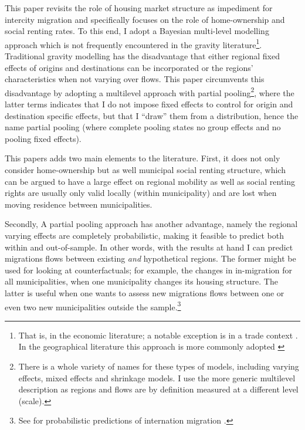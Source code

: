 \documentclass[fleqn,10pt]{SelfArx} %
\begin{document}
        This paper revisits the role of housing market structure as impediment for intercity migration and specifically focuses on the role of home-ownership and social renting rates. To this end, I adopt a Bayesian multi-level
        modelling approach which is not frequently encountered in the
        gravity literature\footnote{That is, in the economic literature; a notable exception is in a trade
        context \citet{ranjan2007bayesian}. In the geographical literature this approach is more commonly adopted \citep[see within a migration context][]{congdon2010random, congdon2012spatial}}. Traditional gravity modelling
        has the disadvantage that either regional fixed effects of
        origins and destinations can be incorporated or the regions'
        characteristics when not varying over flows. This paper circumvents this disadvantage by adopting a
        multilevel approach with partial pooling\footnote{There is a
        whole variety of names for these types of models, including
        varying effects, mixed effects and shrinkage models. I use
        the more generic multilevel description as regions and flows
        are by definition measured at a different level (scale).},
        where the latter terms indicates that I do not impose fixed effects to control for
        origin and destination specific effects, but that I ``draw''
        them from a distribution, hence the name partial pooling
        (where complete pooling states no group effects and no pooling
        fixed effects).
               
        This papers adds two main elements to the
        literature. First, it does not only consider home-ownership
        but as well municipal social renting structure, which can be
        argued \citep[see, e.g.,][]{boyle1998migration, hughes1981council} to have a large effect on regional mobility as well as
        social renting rights are usually only valid locally (within
        municipality) and are lost when moving residence between
        municipalities.
        
        Secondly, A partial pooling approach has another advantage, namely the
        regional varying effects are completely probabilistic, making
        it feasible to predict both within and out-of-sample. In other
        words, with the results at hand I can predict migrations flows between
        existing \emph{and} hypothetical regions. The former might be used for looking at counterfactuals; for example, the changes in in-migration for all municipalities, when one municipality changes its housing structure. The latter is useful when one wants to assess new migrations flows between one or even two new municipalities outside the sample.\footnote{See for probabilistic predictions of internation migration \cite{azose2015bayesian}.}
        
\end{document}
